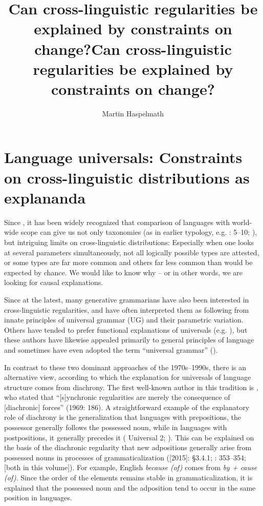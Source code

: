 \documentclass[output=paper]{langsci/langscibook}
\author{Martin Haspelmath\affiliation{MPI-SHH Jena \& Leipzig University}}
\title{Can cross-linguistic regularities be explained by constraints on change?}
\begin{document}
\maketitle 

\title{{Can cross-linguistic} regularities be explained by constraints on change?}

 
 

\section{Language universals: Constraints on cross-linguistic distributions as explananda}

Since \citet{Greenberg1963}, it has been widely recognized that comparison of languages with world-wide scope can give us not only taxonomies (as in earlier typology, e.g. \citealt{Schlegel1808,Schleicher1850}: 5–10; \citealt{Sapir1921}), but intriguing limits on cross-linguistic distributions: Especially when one looks at several parameters simultaneously, not all logically possible types are attested, or some types are far more common and others far less common than would be expected by chance. We would like to know why – or in other words, we are looking for causal explanations.

Since \citet{Chomsky1981} at the latest, many generative grammarians have also been interested in cross-linguistic regularities, and have often interpreted them as following from innate principles of universal grammar (UG) and their parametric variation. Others have tended to prefer functional explanations of universals (e.g. \citealt{Comrie1989,Stassen1985,Dixon1994,Dik1997,Hawkins2014_VarEff}), but these authors have likewise appealed primarily to general principles of language and sometimes have even adopted the term “universal grammar” (\citealt{KeenanComrie1977,FoleyVanValin1984,Stassen1985}).

In contrast to these two dominant approaches of the 1970s–1990s, there is an alternative view, according to which the explanation for universals of language structure comes from diachrony. The first well-known author in this tradition is \citet{Greenberg1969}, who stated that “[s]ynchronic regularities are merely the consequence of [diachronic] forces” (1969: 186). A straightforward example of the explanatory role of diachrony is the generalization that languages with prepositions, the possessor generally follows the possessed noun, while in languages with postpositions, it generally precedes it ( Universal 2; \citealt{Dryer1992}). This can be explained on the basis of the diachronic regularity that new adpositions generally arise from possessed nouns in processes of grammaticalization (\citealt{Lehmann1982}[2015]: §3.4.1; \citealt{Bybee1988}: 353–354; \citealt{Collins2019tv,Dryer2019tv} [both in  this volume]). For example, English \textit{because (of)} comes from \textit{by + cause (of)}. Since the order of the elements remains stable in grammaticalization, it is explained that the possessed noun and the adposition tend to occur in the same position in languages.
\end{document}

